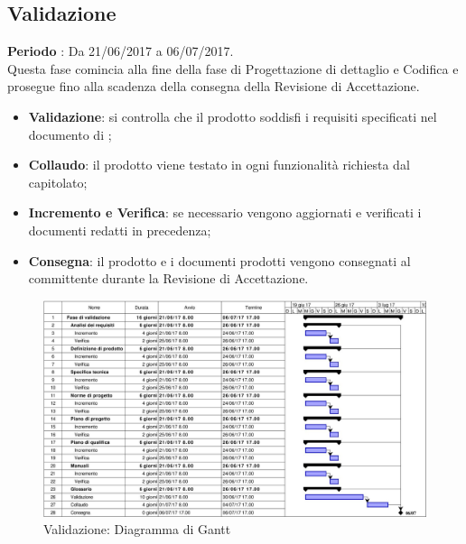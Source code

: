 \documentclass[../PianoDiProgetto.tex]{subfiles}
\begin{document}
		\subsection{Validazione}
		\textbf{Periodo} : Da 21/06/2017 a 06/07/2017. \\
		Questa fase comincia alla fine della fase di Progettazione di dettaglio e Codifica e prosegue fino alla scadenza della consegna della Revisione di Accettazione.
		\begin{itemize}
			\item \textbf{Validazione}: si controlla che il prodotto soddisfi i requisiti specificati nel documento di \analisideirequisiti ;
			\item \textbf{Collaudo}: il prodotto viene testato in ogni funzionalità richiesta dal capitolato;
			\item \textbf{Incremento e Verifica}: se necessario vengono aggiornati e verificati i documenti redatti in precedenza;
			\item \textbf{Consegna}: il prodotto e i documenti prodotti vengono consegnati al committente durante la Revisione di Accettazione.
		\end{itemize}
		\begin{figure}[H]
			\centering
			\includegraphics[scale=0.55]{Figures/Gantt_Validazione.jpg}
			\caption{Validazione: Diagramma di Gantt}
		\end{figure}
			
\end{document}
